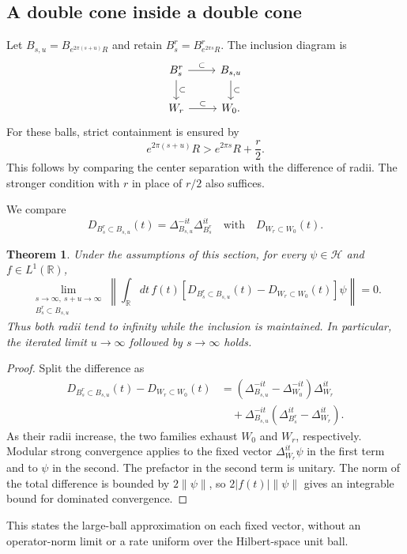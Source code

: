 \documentclass[a4paper,11pt]{article}
\newtheorem{theorem}{Theorem}
\theoremstyle{definition}
\begin{document}
\subsection{A double cone inside a double cone}\label{subsection:coneinsidecone}

Let $B_{s,u}=B_{e^{2\pi(s+u)}R}$ and retain $B_s^r=B_{e^{2\pi s}R}^r$. The inclusion diagram is
\begin{equation}
 \begin{tikzcd}
 B_s^r\arrow[r,"\subset"]\arrow[d,"\subset"]
 &B_{s,u}\arrow[d,"\subset"]\\
 W_r\arrow[r,"\subset"]&W_0.
 \end{tikzcd}
\end{equation}
For these balls, strict containment is ensured by
\begin{equation}
 e^{2\pi(s+u)}R>e^{2\pi s}R+\frac r2.
 \label{eq:approx-ball-containment}
\end{equation}
This follows by comparing the center separation with the difference of radii. The stronger condition with $r$ in place of $r/2$ also suffices.

We compare
\begin{equation}
 D_{B_s^r\subset B_{s,u}}(t)=\Delta_{B_{s,u}}^{-it}\Delta_{B_s^r}^{it}
 \quad\text{with}\quad D_{W_r\subset W_0}(t).
\end{equation}

\begin{theorem}\label{theorem:ballinsideball}
Under the assumptions of this section, for every $\psi\in\mathcal H$ and
$f\in L^1(\mathbb R)$,
\begin{equation}
 \lim_{\substack{s\to\infty,\ s+u\to\infty\\ B_s^r\subset B_{s,u}}}
 \left\|\int_{\mathbb R}dt\,f(t)
 [D_{B_s^r\subset B_{s,u}}(t)-D_{W_r\subset W_0}(t)]\psi\right\|=0.
 \label{eq:approx-ball-ball-limit}
\end{equation}
Thus both radii tend to infinity while the inclusion is maintained. In particular,
the iterated limit $u\to\infty$ followed by $s\to\infty$ holds.
\end{theorem}
\begin{proof}
Split the difference as
\begin{align}
 D_{B_s^r\subset B_{s,u}}(t)-D_{W_r\subset W_0}(t)
 &=(\Delta_{B_{s,u}}^{-it}-\Delta_{W_0}^{-it})\Delta_{W_r}^{it}\nonumber\\
 &\quad+\Delta_{B_{s,u}}^{-it}
 (\Delta_{B_s^r}^{it}-\Delta_{W_r}^{it}).
\end{align}
As their radii increase, the two families exhaust $W_0$ and $W_r$, respectively.
Modular strong convergence applies to the fixed vector $\Delta_{W_r}^{it}\psi$
in the first term and to $\psi$ in the second. The prefactor in the second term
is unitary. The norm of the total difference is bounded by $2\|\psi\|$,
so $2|f(t)|\|\psi\|$ gives an integrable bound for dominated convergence.
\end{proof}
This states the large-ball approximation on each fixed vector, without an
operator-norm limit or a rate uniform over the Hilbert-space unit ball.
\end{document}
